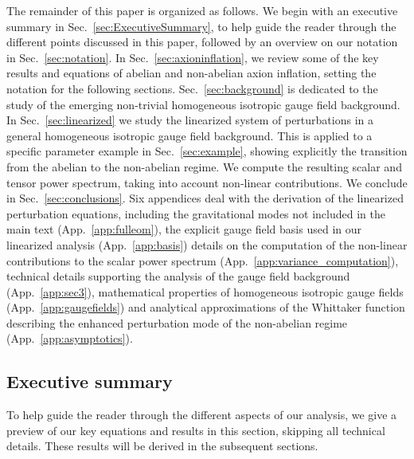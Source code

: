 The remainder of this paper is organized as follows. We begin with an executive summary in Sec.~\ref{sec:ExecutiveSummary}, to help  guide the reader through the different points discussed in this paper, followed by an overview on our notation in Sec.~\ref{sec:notation}. In Sec.~\ref{sec:axioninflation}, we review some of the key results and equations of abelian and non-abelian axion inflation, setting the notation for the following sections. Sec.~\ref{sec:background} is dedicated to the study of the emerging non-trivial homogeneous isotropic gauge field background. In Sec.~\ref{sec:linearized} we study the linearized system of perturbations in a general homogeneous isotropic gauge field background. This is applied to a specific parameter example in Sec.~\ref{sec:example}, showing explicitly the transition from the abelian to the non-abelian regime. We compute the resulting scalar and tensor power spectrum, taking into account non-linear contributions. We conclude in Sec.~\ref{sec:conclusions}. Six appendices deal with the derivation of the linearized perturbation equations, including the gravitational modes not included in the main text (App.~\ref{app:fulleom}), the explicit gauge field basis used in our linearized analysis (App.~\ref{app:basis}) details on the computation of the non-linear contributions to the scalar power spectrum (App.~\ref{app:variance_computation}), technical details supporting the analysis of the gauge field background (App.~\ref{app:sec3}), mathematical properties of homogeneous isotropic gauge fields (App.~\ref{app:gaugefields}) and analytical approximations of the Whittaker function describing the enhanced perturbation mode of the non-abelian regime (App.~\ref{app:asymptotics}).



\subsection{Executive summary \label{sec:ExecutiveSummary}}

To help guide the reader through the different aspects of our analysis, we give a preview of our key equations and results in this section, skipping all technical details. These results will be derived in the subsequent sections.

